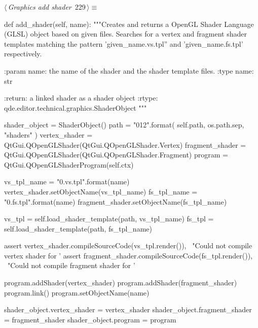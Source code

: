 \documentclass[%
    a4paper,    %
    justified,  %
    nobib,      %
    openany     %
]{tufte-book}
\makeatletter
\renewcommand{\label}[1]{\@tufte@label{##1}}%
\makeatother
\begin{document}
\begin{fullwidth}
\begin{flushleft}
\begin{minipage}{\linewidth}
\begin{list}{}{\setlength{\itemsep}{-\parsep}\setlength{\itemindent}{-\leftmargin}}
\item{}
\end{list}
\end{minipage}\vspace{4ex}
\end{flushleft}
\begin{flushleft} \small
\begin{minipage}{\linewidth}\label{scrap239}\raggedright\small
{} $\langle\,${\itshape Graphics add shader}\nobreak\ {\footnotesize {229}}$\,\rangle\equiv$
\vspace{-1ex}
\begin{pythoncode}
def add_shader(self, name):
    """Creates and returns a OpenGL Shader Language (GLSL) object based on
    given files. Searches for a vertex and fragment shader templates
    matching the pattern 'given_name.vs.tpl'' and 'given_name.fs.tpl'
    respectively.

    :param name: the name of the shader and the shader template files.
    :type  name: str

    :return: a linked shader as a shader object
    :rtype:  qde.editor.technical.graphics.ShaderObject
    """

    shader_object = ShaderObject()
    path   = "{0}{1}{2}".format(
        self.path, os.path.sep, "shaders"
    )
    vertex_shader   = QtGui.QOpenGLShader(QtGui.QOpenGLShader.Vertex)
    fragment_shader = QtGui.QOpenGLShader(QtGui.QOpenGLShader.Fragment)
    program         = QtGui.QOpenGLShaderProgram(self.ctx)

    vs_tpl_name = "{0}.vs.tpl".format(name)
    vertex_shader.setObjectName(vs_tpl_name)
    fs_tpl_name = "{0}.fs.tpl".format(name)
    fragment_shader.setObjectName(fs_tpl_name)

    vs_tpl = self.load_shader_template(path, vs_tpl_name)
    fs_tpl = self.load_shader_template(path, fs_tpl_name)

    assert vertex_shader.compileSourceCode(vs_tpl.render()), \
        "Could not compile vertex shader for '%
    assert fragment_shader.compileSourceCode(fs_tpl.render()), \
        "Could not compile fragment shader for '%

    program.addShader(vertex_shader)
    program.addShader(fragment_shader)
    program.link()
    program.setObjectName(name)

    shader_object.vertex_shader = vertex_shader
    shader_object.fragment_shader = fragment_shader
    shader_object.program = program


\end{pythoncode}
\end{minipage}
\end{flushleft}
\end{fullwidth}
\end{document}
